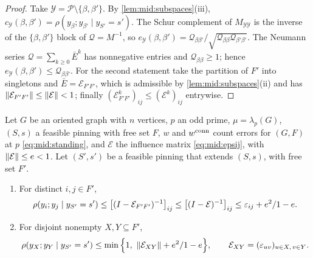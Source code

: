 \begin{proof}
Take $\mathcal Y=\mathcal P\setminus\{\beta,\beta'\}$. By
\cref{lem:mid:subspaces}(iii), $c_{\mathcal
Y}(\beta,\beta')=\rho(y_\beta;y_{\beta'}\mid y_{S'}=s')$. The Schur complement
of $M_{\mathcal Y\mathcal Y}$ is the inverse of the $\{\beta,\beta'\}$ block of
$\mathcal Q=M^{-1}$, so $e_{\mathcal Y}(\beta,\beta')=\mathcal
Q_{\beta\beta'}/\sqrt{\mathcal Q_{\beta\beta}\mathcal Q_{\beta'\beta'}}$. The
Neumann series $\mathcal Q=\sum_{k\ge0}\bar E^k$ has nonnegative entries and
$\mathcal Q_{\beta\beta}\ge1$; hence $e_{\mathcal Y}(\beta,\beta')\le\mathcal
Q_{\beta\beta'}$. For the second statement take the partition of $F'$ into
singletons and $\bar E=\mathcal E_{F'F'}$, which is admissible by
\cref{lem:mid:subspaces}(ii) and has $\left\|\mathcal E_{F'F'}\right\|\le\left\|\mathcal
E\right\|<1$; finally $(\mathcal E_{F'F'}^k)_{ij}\le(\mathcal E^k)_{ij}$ entrywise.
\end{proof}

\begin{proposition}\label{prop:middle-negative}
Let $G$ be an oriented graph with $n$ vertices, $p$ an odd prime,
$\mu=\lambda_p(G)$, $(S,s)$ a feasible pinning with free set $F$, $w$ and
$w^{\rm conn}$ count errors for $(G,F)$ at $p$ \eqref{eq:mid:standing}, and
$\mathcal E$ the influence matrix \eqref{eq:mid:epsij}, with $\left\|\mathcal
E\right\|\le e<1$. Let $(S',s')$ be a feasible pinning that extends $(S,s)$, with free
set $F'$.
\begin{enumerate}[label=\textup{(\alph*)}]
\item For distinct $i,j\in F'$,
  \[
    \rho(y_i;y_j\mid y_{S'}=s')\le\big[(I-\mathcal E_{F'F'})^{-1}\big]_{ij}\le
    \big[(I-\mathcal E)^{-1}\big]_{ij}\le\varepsilon_{ij}+e^2/1-e .
  \]
\item For disjoint nonempty $X,Y\subseteq F'$,
  \[
    \rho(y_X;y_Y\mid y_{S'}=s')\le\min\Big\{1,\ \norm{\mathcal
    E_{XY}}+\frac{e^2}{1-e}\Big\},\qquad \mathcal E_{XY}=(\eps_{uv})_{u\in X,\,v\in Y}.
  \]
\end{enumerate}
\end{proposition}

